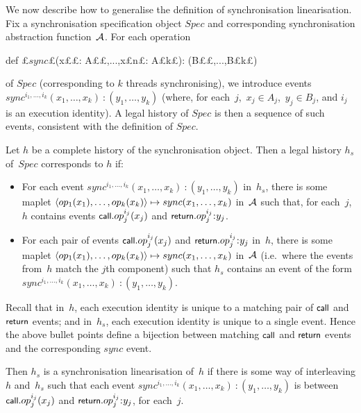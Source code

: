 We now describe how to generalise the definition of synchronisation
linearisation.  Fix a synchronisation specification object $Spec$ and
corresponding synchronisation abstraction function~$\mathcal{A}$.  For each operation
\begin{scala}
  def £$sync$£(x££: A££,...,x£\s n£: A£\s k£): (B££,...,B£\s k£) 
\end{scala}
of $Spec$ (corresponding to $k$ threads synchronising), we introduce events
$sync^{i_1, \ldots, i_k}(x_1, \ldots, x_k)\:: (y_1, \ldots, y_k)$ (where,
for each~$j$,\, $x_j \in A_j$,\, $y_j \in B_j$, and $i_j$ is an execution
identity).  A legal history of $Spec$ is then a sequence of such events,
consistent with the definition of $Spec$.

\begin{definition}
\label{def:sync-lin}
Let $h$ be a complete history of the synchronisation object.  Then a legal
history $h_s$ of~$Spec$ corresponds to $h$ if:
\begin{itemize}
\item
For each event $sync^{i_1, \ldots, i_k}(x_1, \ldots, x_k)\:: (y_1, \ldots,
y_k)$ in~$h_s$, there is some maplet $\langle  op_1(x_1), \ldots, op_k(x_k)  \rangle
\mapsto sync(x_1,\ldots,x_k)$ in~$\mathcal{A}$ such that, for each~$j$, $h$ contains
events $\mbox{\sf{\small call}}.op_j^{i_j}(x_j)$ and $\return.op_j^{i_j}\:: y_j$.

\item For each pair of events $\mbox{\sf{\small call}}.op_j^{i_j}(x_j)$ and
  $\return.op_j^{i_j}\:: y_j$
in~$h$, there is some maplet $\langle  op_1(x_1), \ldots, op_k(x_k)  \rangle
\mapsto sync(x_1,\ldots,x_k)$ in~$\mathcal{A}$ (i.e.~where the events from~$h$ match
the $j$th component)  such that
$h_s$ contains an event of the form $sync^{i_1, \ldots, i_k}(x_1,
\ldots, x_k)\:: (y_1, \ldots, y_k)$.
\end{itemize}
%
Recall that in~$h$, each execution identity is unique to a matching pair of
$\mbox{\sf{\small call}}$ and $\mbox{\sf{\small return}}$ events; and in~$h_s$, each execution identity is unique
to a single event.  Hence the above bullet points define a bijection between
matching $\mbox{\sf{\small call}}$ and $\mbox{\sf{\small return}}$ events and the corresponding $sync$ event.

Then $h_s$ is a synchronisation linearisation of~$h$ if there is some way of
interleaving $h$ and~$h_s$ such that each event $sync^{i_1, \ldots, i_k}(x_1,
\ldots, x_k)\:: (y_1, \ldots, y_k)$ is between $\mbox{\sf{\small call}}.op_j^{i_j}(x_j)$
and $\return.op_j^{i_j}\::y_j$, for each~$j$. 
\end{definition}

